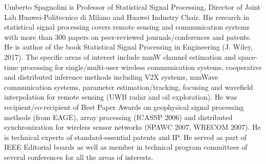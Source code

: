 \documentclass[journal]{IEEEtran}
\begin{document}
\begin{IEEEbiography} {Umberto Spagnolini} is Professor of Statistical Signal Processing, Director of Joint Lab Huawei-Politecnico di Milano and Huawei Industry Chair. His research in statistical signal processing covers remote sensing and communication systems with more than 300 papers on peer-reviewed journals/conferences and patents. He is author of the book Statistical Signal Processing in Engineering (J. Wiley, 2017). The specific areas of interest include mmW channel estimation and space-time processing for single/multi-user wireless communication systems, cooperative and distributed inference methods including V2X systems, mmWave communication systems, parameter estimation/tracking, focusing and wavefield interpolation for remote sensing (UWB radar and oil exploration). He was recipient/co-recipient of Best Paper Awards on geophysical signal processing methods (from EAGE), array processing (ICASSP 2006) and distributed synchronization for wireless sensor networks (SPAWC 2007, WRECOM 2007). He is technical experts of standard-essential patents and IP. He served as part of IEEE Editorial boards as well as member in technical program committees of several conferences for all the areas of interests.
\end{IEEEbiography}


\end{document}
